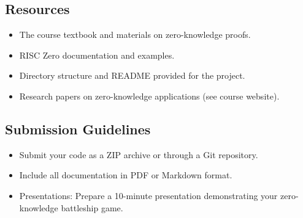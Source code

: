 \documentclass[10pt,a4paper,american]{article}
\begin{document}
\subsection*{Resources}
\begin{itemize}
	\item The course textbook and materials on zero-knowledge proofs.
	\item RISC Zero documentation and examples.
	\item Directory structure and README provided for the project.
	\item Research papers on zero-knowledge applications (see course website).
\end{itemize}

\subsection*{Submission Guidelines}
\begin{itemize}
	\item Submit your code as a ZIP archive or through a Git repository.
	\item Include all documentation in PDF or Markdown format.
	\item Presentations: Prepare a 10-minute presentation demonstrating your zero-knowledge battleship game.
\end{itemize}
\end{document}
